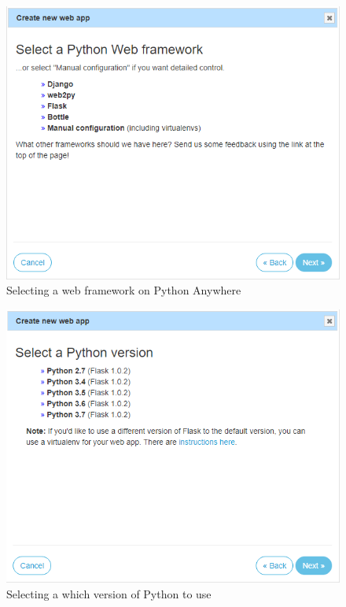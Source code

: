 \documentclass[10pt,a4paper]{article}
\begin{document}
\begin{figure}[H]
\centering
  \includegraphics[width=\linewidth]{images/webappframework.png}
  \caption{Selecting a web framework on Python Anywhere}
  \label{fig:webappframework}
\end{figure}

\begin{figure}[H]
\centering
  \includegraphics[width=\linewidth]{images/webapppython.png}
  \caption{Selecting a which version of Python to use}
  \label{fig:webapppython}
\end{figure}
\end{document}
